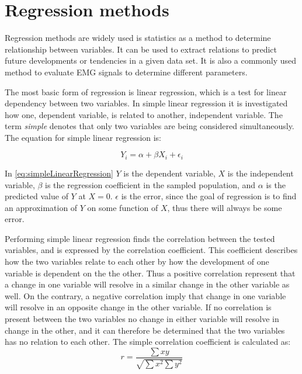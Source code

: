 \section{Regression methods} \label{sec:regression}

	

Regression methods are widely used is statistics as a method to determine relationship between variables. It can be used to extract relations to predict future developments or tendencies in a given data set. It is also a commonly used method to evaluate EMG signals to determine different parameters. 

The most basic form of regression is linear regression, which is a test for linear dependency between two variables. In simple linear regression it is investigated how one, dependent variable, is related to another, independent variable. The term \textit{simple} denotes that only two variables are being considered simultaneously. The equation for simple linear regression is: \cite{zar2009}

\begin{equation} \label{eq:simpleLinearRegression}
Y_i = \alpha + \beta X_i + \epsilon_i
\end{equation}

In \eqref{eq:simpleLinearRegression} $Y$ is the dependent variable, $X$ is the independent variable, $\beta$ is the regression coefficient in the sampled population, and $\alpha$ is the predicted value of $Y$ at $X = 0$. $\epsilon$ is the error, since the goal of regression is to find an approximation of $Y$ on some function of $X$, thus there will always be some error.

Performing simple linear regression finds the correlation between the tested variables, and is expressed by the correlation coefficient. This coefficient describes how the two variables relate to each other by how the development of one variable is dependent on the the other. Thus a positive correlation represent that a change in one variable will resolve in a similar change in the other variable as well. On the contrary, a negative correlation imply that change in one variable will resolve in an opposite change in the other variable. If no correlation is present between the two variables no change in either variable will resolve in change in the other, and it can therefore be determined that the two variables has no relation to each other. \cite{zar2009}
The simple correlation coefficient is calculated as: \cite{zar2009}
\begin{equation}
r = \frac{\sum xy}{\sqrt{\sum x^{2} \sum y^{2}}}
\end{equation}

